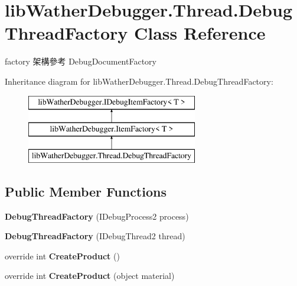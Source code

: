\hypertarget{classlib_wather_debugger_1_1_thread_1_1_debug_thread_factory}{\section{lib\+Wather\+Debugger.\+Thread.\+Debug\+Thread\+Factory Class Reference}
\label{classlib_wather_debugger_1_1_thread_1_1_debug_thread_factory}
}


factory 架構參考 Debug\+Document\+Factory  


Inheritance diagram for lib\+Wather\+Debugger.\+Thread.\+Debug\+Thread\+Factory\+:\begin{figure}[H]
\begin{center}
\leavevmode
\includegraphics[height=3.000000cm]{classlib_wather_debugger_1_1_thread_1_1_debug_thread_factory}
\end{center}
\end{figure}
\subsection*{Public Member Functions}
\begin{DoxyCompactItemize}
\item 
\hypertarget{classlib_wather_debugger_1_1_thread_1_1_debug_thread_factory_aa9ab2d6d3fada41edd8c83ab4d354fbd}{{\bfseries Debug\+Thread\+Factory} (I\+Debug\+Process2 process)}\label{classlib_wather_debugger_1_1_thread_1_1_debug_thread_factory_aa9ab2d6d3fada41edd8c83ab4d354fbd}

\item 
\hypertarget{classlib_wather_debugger_1_1_thread_1_1_debug_thread_factory_a0bbbc12d3d0c039bd3fc23a341c21665}{{\bfseries Debug\+Thread\+Factory} (I\+Debug\+Thread2 thread)}\label{classlib_wather_debugger_1_1_thread_1_1_debug_thread_factory_a0bbbc12d3d0c039bd3fc23a341c21665}

\item 
\hypertarget{classlib_wather_debugger_1_1_thread_1_1_debug_thread_factory_a60989b9599057b36af729e86bfdf1527}{override int {\bfseries Create\+Product} ()}\label{classlib_wather_debugger_1_1_thread_1_1_debug_thread_factory_a60989b9599057b36af729e86bfdf1527}

\item 
\hypertarget{classlib_wather_debugger_1_1_thread_1_1_debug_thread_factory_a8bf73304d11c46daa6628cc89beff98a}{override int {\bfseries Create\+Product} (object material)}\label{classlib_wather_debugger_1_1_thread_1_1_debug_thread_factory_a8bf73304d11c46daa6628cc89beff98a}

\end{DoxyCompactItemize}
